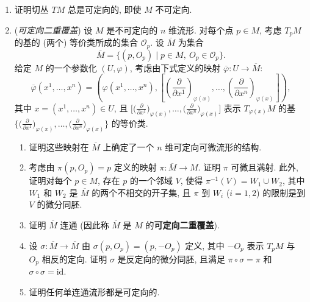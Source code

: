 \begin{RiemannExercise}
\begin{enumerate}[label=(\arabic*),ref=\arabic*,leftmargin=*]
\item\label{ex:orientability-of-tangent-bundle} 证明切丛 $TM$ 总是可定向的, 即使 $M$ 不可定向.
\item\label{ex:orientable-double-covering} (\emph{可定向二重覆盖}) 设 $M$ 是不可定向的 $n$ 维流形. 对每个点 $p\in M$, 考虑 $T_pM$ 的基的 (两个) 等价类所成的集合 $\mathcal{O}_p$. 设 $\overline M$ 为集合
\[
  \overline M=\{(p,O_p)\mid p\in M,\ O_p\in\mathcal{O}_p\}.
\]
给定 $M$ 的一个参数化 $(U,\varphi)$, 考虑由下式定义的映射 $\overline{\varphi}:U\to\overline M$:
\[
  \overline{\varphi}(x^1,\ldots,x^n)
  =\left(\varphi(x^1,\ldots,x^n),
    \left[\left(\frac{\partial}{\partial x^1}\right)_{\varphi(x)},
       \ldots,\left(\frac{\partial}{\partial x^n}\right)_{\varphi(x)}\right]\right),
\]
其中 $x=(x^1,\ldots,x^n)\in U$, 且 $\bigl[\bigl(\frac{\partial}{\partial x^1}\bigr)_{\varphi(x)},\allowbreak\ldots,\bigl(\frac{\partial}{\partial x^n}\bigr)_{\varphi(x)}\bigr]$ 表示 $T_{\varphi(x)}M$ 的基 $\bigl\{\bigl(\frac{\partial}{\partial x^1}\bigr)_{\varphi(x)},\allowbreak\ldots,\bigl(\frac{\partial}{\partial x^n}\bigr)_{\varphi(x)}\bigr\}$ 的等价类.
\begin{enumerate}[label=(\alph*),leftmargin=*]
\item 证明这些映射在 $\overline M$ 上确定了一个 $n$ 维可定向可微流形的结构.
\item 考虑由 $\pi(p,O_p)=p$ 定义的映射 $\pi:\overline M\to M$. 证明 $\pi$ 可微且满射. 此外, 证明对每个 $p\in M$, 存在 $p$ 的一个邻域 $V$, 使得 $\pi^{-1}(V)=W_1\cup W_2$, 其中 $W_1$ 和 $W_2$ 是 $\overline M$ 的两个不相交的开子集, 且 $\pi$ 到 $W_i$ ($i=1,2$) 的限制是到 $V$ 的微分同胚.
\item 证明 $\overline M$ 连通 (因此称 $\overline M$ 是 $M$ 的\textbf{可定向二重覆盖}).
\item 设 $\sigma:\overline M\to\overline M$ 由 $\sigma(p,O_p)=(p,-O_p)$ 定义, 其中 $-O_p$ 表示 $T_pM$ 与 $O_p$ 相反的定向. 证明 $\sigma$ 是反定向的微分同胚, 且满足 $\pi\circ\sigma=\pi$ 和 $\sigma\circ\sigma=\mathrm{id}$.
\item 证明任何单连通流形都是可定向的.
\end{enumerate}
\end{enumerate}
\end{RiemannExercise}
